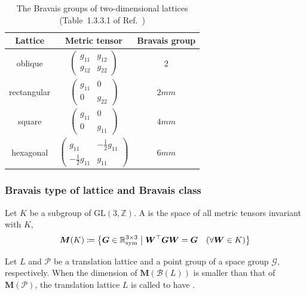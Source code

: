 \begin{table}[htb]
  \centering
  \caption{The Bravais groups of two-dimensional lattices (Table~1.3.3.1 of Ref.~\cite{ITA2016})}
  \label{tab:two-dimensional-Bravais-groups}
  \begin{tabular}{ccc}
    \hline\hline
    Lattice & Metric tensor & Bravais group \\ \hline
    oblique & $\begin{pmatrix} g_{11} & g_{12} \\ g_{12} & g_{22} \end{pmatrix}$ & $2$ \\
    rectangular & $\begin{pmatrix} g_{11} & 0 \\ 0 & g_{22} \end{pmatrix}$ & $2mm$ \\
    square & $\begin{pmatrix} g_{11} & 0 \\ 0 & g_{11} \end{pmatrix}$ & $4mm$ \\
    hexagonal & $\begin{pmatrix} g_{11} & -\frac{1}{2} g_{11} \\ -\frac{1}{2} g_{11} & g_{11} \end{pmatrix}$ & $6mm$ \\
    \hline\hline
  \end{tabular}
\end{table}

\subsubsection{Bravais type of lattice and Bravais class}

\begin{screen}
  \begin{defn}
    Let $K$ be a subgroup of $\mathrm{GL}(3, \mathbb{Z})$.
    A  is the space of all metric tensors invariant with $K$,
    \begin{align}
      \bm{M}( K ) \coloneqq \left\{  \bm{G} \in \mathbb{R}^{3 \times 3}_{\mathrm{sym}}  \mathrel{}\middle|\mathrel{}  \bm{W}^{\top}\bm{G}\bm{W} = \bm{G} \quad (\forall \bm{W} \in K )  \right\}
    \end{align}
  \end{defn}
\end{screen}

Let $L$ and $\mathcal{P}$ be a translation lattice and a point group of a space group $\mathcal{G}$, respectively.
When the dimension of $\bm{M}(\mathcal{B}(L))$ is smaller than that of $\bm{M}(\mathcal{P})$, the translation lattice $L$ is called to have .

